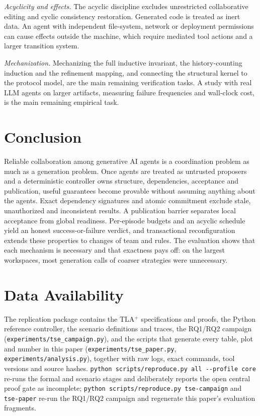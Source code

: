 \documentclass[10pt,journal,compsoc]{IEEEtran}
\theoremstyle{plain}
\theoremstyle{definition}
\begin{document}
\emph{Acyclicity and effects.} The acyclic discipline excludes unrestricted collaborative editing and cyclic consistency restoration. Generated code is treated as inert data. An agent with independent file-system, network or deployment permissions can cause effects outside the machine, which require mediated tool actions and a larger transition system.

\emph{Mechanization.} Mechanizing the full inductive invariant, the history-counting induction and the refinement mapping, and connecting the structural kernel to the protocol model, are the main remaining verification tasks. A study with real LLM agents on larger artifacts, measuring failure frequencies and wall-clock cost, is the main remaining empirical task.

\section{Conclusion}\label{sec:conclusion}
Reliable collaboration among generative AI agents is a coordination problem as much as a generation problem. Once agents are treated as untrusted proposers and a deterministic controller owns structure, dependencies, acceptance and publication, useful guarantees become provable without assuming anything about the agents. Exact dependency signatures and atomic commitment exclude stale, unauthorized and inconsistent results. A publication barrier separates local acceptance from global readiness. Per-episode budgets and an acyclic schedule yield an honest success-or-failure verdict, and transactional reconfiguration extends these properties to changes of team and rules. The evaluation shows that each mechanism is necessary and that exactness pays off: on the largest workspaces, most generation calls of coarser strategies were unnecessary.

\section*{Data Availability}\label{sec:data}
The replication package contains the TLA$^+$ specifications and proofs, the Python reference controller, the scenario definitions and traces, the RQ1/RQ2 campaign (\texttt{experiments/tse\_campaign.py}), and the scripts that generate every table, plot and number in this paper (\texttt{experiments/tse\_paper.py}, \texttt{experiments/analysis.py}), together with raw logs, exact commands, tool versions and source hashes. \texttt{python scripts/reproduce.py all -{}-profile core} re-runs the formal and scenario stages and deliberately reports the open central proof gate as incomplete; \texttt{python scripts/reproduce.py tse-campaign} and \texttt{tse-paper} re-run the RQ1/RQ2 campaign and regenerate this paper's evaluation fragments.
\end{document}
